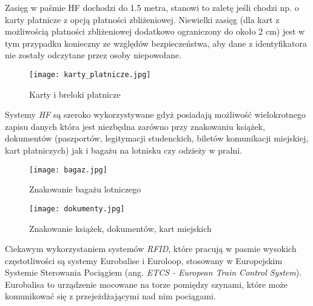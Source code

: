 \begin{itemize}
\begin{itemize}
\begin{itemize}
	Zasięg w paśmie HF dochodzi do 1.5 metra, stanowi to zaletę jeśli chodzi np. o karty płatnicze z opcją płatności zbliżeniowej. Niewielki zasięg (dla kart z możliwością płatności zbliżeniowej dodatkowo ograniczony do około 2 cm) jest w tym przypadku konieczny ze względów bezpieczeństwa, aby dane z identyfikatora nie zostały odczytane przez osoby niepowołane. 

	\begin{figure}[h!]
	\centering
	    \texttt{[image: karty\_platnicze.jpg]}
	    \caption{Karty i breloki płatnicze}
	\end{figure}

	Systemy \emph{HF} są szeroko wykorzystywane gdyż posiadają możliwość wielokrotnego zapisu danych która jest niezbędna zarówno przy znakowaniu książek, dokumentów (paszportów, legitymacji studenckich, biletów komunikacji miejskiej, kart płatniczych) jak i bagażu na lotnisku czy odzieży w pralni.

	\begin{figure}[h!]
	\centering
	    \texttt{[image: bagaz.jpg]}
	    \caption{Znakowanie bagażu lotniczego}
	\end{figure}

	\begin{figure}[h!]
	\centering
	    \texttt{[image: dokumenty.jpg]}
	    \caption{Znakowanie książek, dokumentów, kart miejskich}
	\end{figure}
	
	Ciekawym wykorzystaniem systemów \emph{RFID}, które pracują w pasmie wysokich częstotliwości są systemy Eurobalise i Euroloop, stosowany w Europejskim Systemie Sterowania Pociągiem (ang. \emph{ETCS - European Train Control System}). Eurobalisa to urządzenie mocowane na torze pomiędzy szynami, które może komunikować się z przejeżdżającymi nad nim pociągami.



\end{itemize}
\end{itemize}
\end{itemize}
